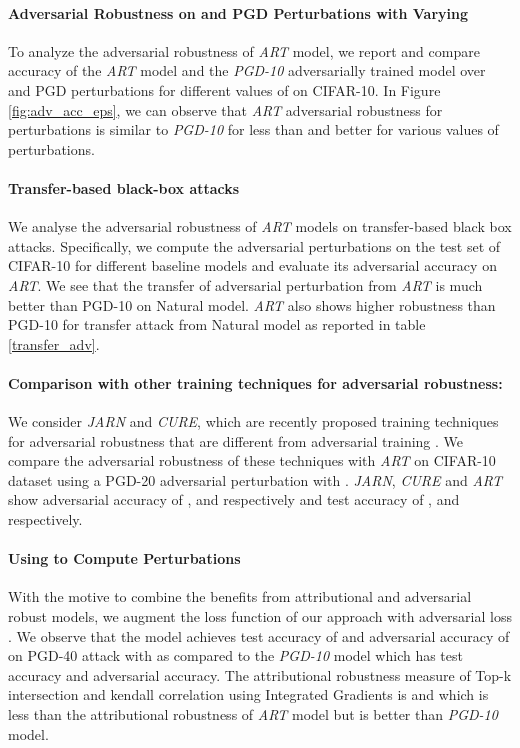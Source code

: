 \documentclass[runningheads]{llncs}
\begin{document}
\paragraph{\textbf{Adversarial Robustness on  and  PGD Perturbations with Varying }}
To analyze the adversarial robustness of \textit{ART} model, we report and compare accuracy of the \textit{ART} model and the \textit{PGD-10} adversarially trained model over  and  PGD perturbations for different values of  on CIFAR-10. In Figure \ref{fig:adv_acc_eps}, we can observe that \textit{ART} adversarial robustness for  perturbations is similar to \textit{PGD-10} for  less than  and better for various values of  perturbations.

\paragraph{\textbf{Transfer-based black-box attacks}}
We analyse the adversarial robustness of \textit{ART} models on transfer-based black box attacks. Specifically, we compute the adversarial perturbations on the test set of CIFAR-10 for different baseline models and evaluate its adversarial accuracy on \textit{ART}. We see that the transfer of adversarial perturbation from \textit{ART} is much better than PGD-10 on Natural model. \textit{ART} also shows higher robustness than PGD-10 for transfer attack from Natural model as reported in table \ref{transfer_adv}.


\paragraph{\textbf{Comparison with other training techniques for adversarial robustness:}}
We consider \textit{JARN}\cite{jarn_iclr} and \textit{CURE}\cite{cure}, which are recently proposed training techniques for adversarial robustness that are different from adversarial training \cite{madrypgd}. We compare the adversarial robustness of these techniques with \textit{ART} on CIFAR-10 dataset using a  PGD-20 adversarial perturbation with . \textit{JARN}, \textit{CURE} and \textit{ART} show adversarial accuracy of ,  and  respectively and test accuracy of ,  and  respectively. 

\paragraph{\textbf{Using  to Compute Perturbations }}
With the motive to combine the benefits from attributional and adversarial robust models, we augment the loss function of our approach with adversarial loss \cite{madrypgd}.
We observe that the model achieves test accuracy of  and adversarial accuracy of  on PGD-40  attack with  as compared to the \textit{PGD-10} model which has  test accuracy and  adversarial accuracy. The attributional robustness measure of Top-k intersection and kendall correlation using Integrated Gradients is  and  which is less than the attributional robustness of \textit{ART} model but is  better than \textit{PGD-10} model. 
\end{document}
